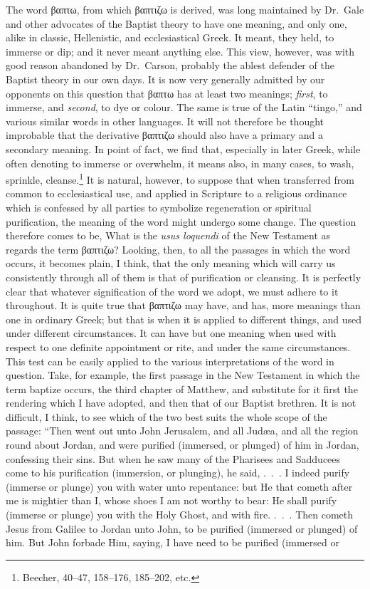 \documentclass[
]{book}
\begin{document}
The word \foreignlanguage{greek}{βαπτω}, from which \foreignlanguage{greek}{βαπτιζω} is derived, was long maintained by Dr.~Gale and other advocates of the Baptist theory to have one meaning, and only one, alike in classic, Hellenistic, and ecclesiastical Greek. It meant, they held, to immerse or dip; and it never meant anything else. This view, however, was with good reason abandoned by Dr.~Carson, probably the ablest defender of the Baptist theory in our own days. It is now very generally admitted by our opponents on this question that \foreignlanguage{greek}{βαπτω} has at least two meanings; \emph{first}, to immerse, and \emph{second}, to dye or colour. The same is true of the Latin ``\foreignlanguage{latin}{tingo},'' and various similar words in other languages. It will not therefore be thought improbable that the derivative \foreignlanguage{greek}{βαπτιζω} should also have a primary and a secondary meaning. In point of fact, we find that, especially in later Greek, while often denoting to immerse or overwhelm, it means also, in many cases, to wash, sprinkle, cleanse.\footnote{Beecher, 40--47, 158--176, 185--202, etc.} It is natural, however, to suppose that when transferred from common to ecclesiastical use, and applied in Scripture to a religious ordinance which is confessed by all parties to symbolize regeneration or spiritual purification, the meaning of the word might undergo some change. The question therefore comes to be, What is the \foreignlanguage{latin}{\emph{usus loquendi}} of the New Testament as regards the term \foreignlanguage{greek}{βαπτιζω}? Looking, then, to all the passages in which the word occurs, it becomes plain, I think, that the only meaning which will carry us consistently through all of them is that of purification or cleansing. It is perfectly clear that whatever signification of the word we adopt, we must adhere to it throughout. It is quite true that \foreignlanguage{greek}{βαπτιζω} may have, and has, more meanings than one in ordinary Greek; but that is when it is applied to different things, and used under different circumstances. It can have but one meaning when used with respect to one definite appointment or rite, and under the same circumstances. This test can be easily applied to the various interpretations of the word in question. Take, for example, the first passage in the New Testament in which the term baptize occurs, the third chapter of Matthew, and substitute for it first the rendering which I have adopted, and then that of our Baptist brethren. It is not difficult, I think, to see which of the two best suits the whole scope of the passage: ``Then went out unto John Jerusalem, and all Judæa, and all the region round about Jordan, and were purified (immersed, or plunged) of him in Jordan, confessing their sins. But when he saw many of the Pharisees and Sadducees come to his purification (immersion, or plunging), he said, .~.~. I indeed purify (immerse or plunge) you with water unto repentance: but He that cometh after me is mightier than I, whose shoes I am not worthy to bear: He shall purify (immerse or plunge) you with the Holy Ghost, and with fire. .~.~. Then cometh Jesus from Galilee to Jordan unto John, to be purified (immersed or plunged) of him. But John forbade Him, saying, I have need to be purified (immersed or 
\end{document}
